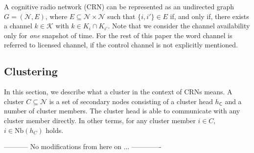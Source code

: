 \documentclass[10pt,journal,compsoc]{IEEEtran}
\theoremstyle{mytheoremstyle}
\theoremstyle{mytheoremstyle}
\theoremstyle{mytheoremstyle}
\newcommand{\ie}{i.e., }
\begin{document}
A cognitive radio network (CRN) can be represented as an undirected graph $G = (\mathcal{N}, E)$, where $E \subseteq \mathcal{N} \times \mathcal{N}$ such that $\{i, i'\} \in E$  if, and only if, there exists a channel $k \in \mathcal{K}$ with $k \in K_{i} \cap K_{i'}$. Note that we consider the channel availability only for \textit{one} snapshot of time. For the rest of this paper the word channel is referred to licensed channel, if the control channel is not explicitly mentioned.



\subsection{Clustering}
\label{def_cluster}
In this section, we describe what a cluster in the context of CRNs means.
A cluster $C \subseteq \mathcal{N}$ is a set of secondary nodes consisting of a cluster head $h_{\textsf{C}}$ and a number of cluster members.
The cluster head is able to communicate with any cluster member directly.
In other terms, for any cluster member $i \in C$, $i \in \text{Nb} (h_C) $ holds.



----------- No modifications from here on ... -------------
\end{document}

